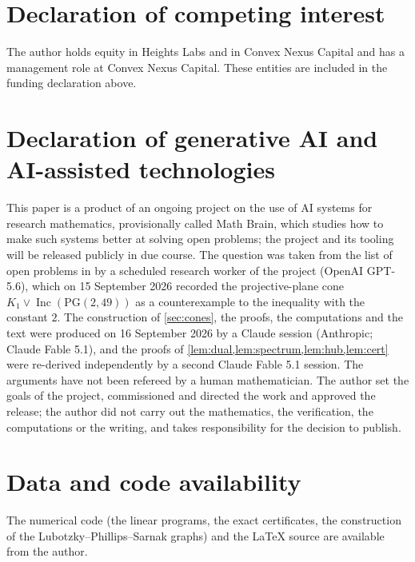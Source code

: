 \documentclass[11pt]{amsart}
\theoremstyle{definition}
\newcommand{\PG}{\mathrm{PG}}
\DeclareMathOperator{\Inc}{Inc}
\begin{document}
\section*{Declaration of competing interest}
The author holds equity in Heights Labs and in Convex Nexus Capital and has a management role at Convex Nexus Capital. These entities are included in the funding declaration above.

\section*{Declaration of generative AI and AI-assisted technologies}
This paper is a product of an ongoing project on the use of AI systems for research mathematics, provisionally called Math Brain, which studies how to make such systems better at solving open problems; the project and its tooling will be released publicly in due course. The question was taken from the list of open problems in \cite{AF} by a scheduled research worker of the project (OpenAI GPT-5.6), which on 15 September 2026 recorded the projective-plane cone $K_1\vee\Inc(\PG(2,49))$ as a counterexample to the inequality with the constant $2$. The construction of \cref{sec:cones}, the proofs, the computations and the text were produced on 16 September 2026 by a Claude session (Anthropic; Claude Fable 5.1), and the proofs of \cref{lem:dual,lem:spectrum,lem:hub,lem:cert} were re-derived independently by a second Claude Fable 5.1 session. The arguments have not been refereed by a human mathematician. The author set the goals of the project, commissioned and directed the work and approved the release; the author did not carry out the mathematics, the verification, the computations or the writing, and takes responsibility for the decision to publish.

\section*{Data and code availability}
The numerical code (the linear programs, the exact certificates, the construction of the Lubotzky--Phillips--Sarnak graphs) and the \LaTeX{} source are available from the author.
\end{document}

